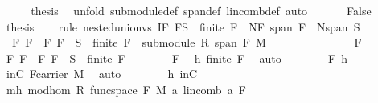 \begin{isabellebody}
\isanewline
\ \ \isamarkupfalse%
\ \isamarkupfalse%
\ {\isacharquery}thesis\ \isamarkupfalse%
\ {\isacharparenleft}unfold\ submodule{\isacharunderscore}def\ span{\isacharunderscore}def\ lincomb{\isacharunderscore}def{\isacharcomma}\ auto{\isacharparenright}\ \isamarkupfalse%
\isanewline
{}\isamarkupfalse%
\ \isanewline
\ \ \isamarkupfalse%
\ False\isanewline
\ \ \isamarkupfalse%
\ {\isacharquery}thesis\isanewline
\ \ \isamarkupfalse%
\ {\isacharparenleft}rule\ nested{\isacharunderscore}union{\isacharunderscore}vs{\isacharbrackleft}\ {\isacharquery}I{\isacharequal}{\isachardoublequoteopen}{\isacharbraceleft}F{\isachardot}\ F{\isasymsubseteq}S\ {\isasymand}\ finite\ F{\isacharbraceright}{\isachardoublequoteclose}\ \ {\isacharquery}N{\isacharequal}{\isachardoublequoteopen}{\isasymlambda}F{\isachardot}\ span\ F{\isachardoublequoteclose}\ \ {\isacharquery}N{\isacharprime}{\isacharequal}{\isachardoublequoteopen}span\ S{\isachardoublequoteclose}{\isacharbrackright}{\isacharparenright}\isanewline
\ \ \ \ \isamarkupfalse%
\ {\isachardoublequoteopen}\ {\isasymAnd}F{\isachardot}\ F\ {\isasymin}\ {\isacharbraceleft}F{\isachardot}\ F\ {\isasymsubseteq}\ S\ {\isasymand}\ finite\ F{\isacharbraceright}\ {\isasymLongrightarrow}\ submodule\ R\ {\isacharparenleft}span\ F{\isacharparenright}\ M{\isachardoublequoteclose}\isanewline
\ \ \ \ \isamarkupfalse%
\ {\isacharminus}\ \isanewline
\ \ \ \ \ \ \isamarkupfalse%
\ F\isanewline
\ \ \ \ \ \ \isamarkupfalse%
\ F{\isacharcolon}\ {\isachardoublequoteopen}F\ {\isasymin}\ {\isacharbraceleft}F{\isachardot}\ F\ {\isasymsubseteq}\ S\ {\isasymand}\ finite\ F{\isacharbraceright}{\isachardoublequoteclose}\isanewline
\ \ \ \ \ \ \isamarkupfalse%
\ F\ \isamarkupfalse%
\ h{}{\isacharcolon}\ {\isachardoublequoteopen}finite\ F{\isachardoublequoteclose}\ \isamarkupfalse%
\ auto\isanewline
\ \ \ \ \ \ \isamarkupfalse%
\ F\ h{}\ \isamarkupfalse%
\ inC{\isacharcolon}\ {\isachardoublequoteopen}F{\isasymsubseteq}carrier\ M{\isachardoublequoteclose}\ \isamarkupfalse%
\ auto\isanewline
\ \ \ \ \ \ \isamarkupfalse%
\ h{}\ inC\ \isamarkupfalse%
\ mh{\isacharcolon}\ mod{\isacharunderscore}hom\ R\ {\isachardoublequoteopen}{\isacharparenleft}func{\isacharunderscore}space\ F{\isacharparenright}{\isachardoublequoteclose}\ M\ {\isachardoublequoteopen}{\isacharparenleft}{\isasymlambda}a{\isachardot}\ lincomb\ a\ F{\isacharparenright}{\isachardoublequoteclose}\ \isanewline

\end{isabellebody}

